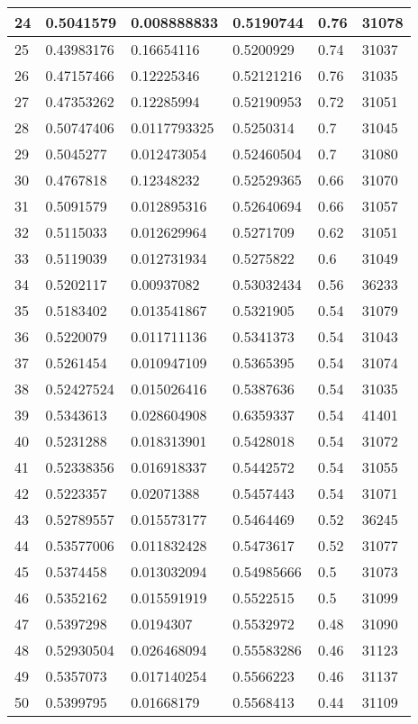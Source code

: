 \begin{longtable}{|l|l|l|l|l|l|}
24 & 0.5041579 & 0.008888833 & 0.5190744 & 0.76 & 31078 \\ \hline 
25 & 0.43983176 & 0.16654116 & 0.5200929 & 0.74 & 31037 \\ \hline 
26 & 0.47157466 & 0.12225346 & 0.52121216 & 0.76 & 31035 \\ \hline 
27 & 0.47353262 & 0.12285994 & 0.52190953 & 0.72 & 31051 \\ \hline 
28 & 0.50747406 & 0.0117793325 & 0.5250314 & 0.7 & 31045 \\ \hline 
29 & 0.5045277 & 0.012473054 & 0.52460504 & 0.7 & 31080 \\ \hline 
30 & 0.4767818 & 0.12348232 & 0.52529365 & 0.66 & 31070 \\ \hline 
31 & 0.5091579 & 0.012895316 & 0.52640694 & 0.66 & 31057 \\ \hline 
32 & 0.5115033 & 0.012629964 & 0.5271709 & 0.62 & 31051 \\ \hline 
33 & 0.5119039 & 0.012731934 & 0.5275822 & 0.6 & 31049 \\ \hline 
34 & 0.5202117 & 0.00937082 & 0.53032434 & 0.56 & 36233 \\ \hline 
35 & 0.5183402 & 0.013541867 & 0.5321905 & 0.54 & 31079 \\ \hline 
36 & 0.5220079 & 0.011711136 & 0.5341373 & 0.54 & 31043 \\ \hline 
37 & 0.5261454 & 0.010947109 & 0.5365395 & 0.54 & 31074 \\ \hline 
38 & 0.52427524 & 0.015026416 & 0.5387636 & 0.54 & 31035 \\ \hline 
39 & 0.5343613 & 0.028604908 & 0.6359337 & 0.54 & 41401 \\ \hline 
40 & 0.5231288 & 0.018313901 & 0.5428018 & 0.54 & 31072 \\ \hline 
41 & 0.52338356 & 0.016918337 & 0.5442572 & 0.54 & 31055 \\ \hline 
42 & 0.5223357 & 0.02071388 & 0.5457443 & 0.54 & 31071 \\ \hline 
43 & 0.52789557 & 0.015573177 & 0.5464469 & 0.52 & 36245 \\ \hline 
44 & 0.53577006 & 0.011832428 & 0.5473617 & 0.52 & 31077 \\ \hline 
45 & 0.5374458 & 0.013032094 & 0.54985666 & 0.5 & 31073 \\ \hline 
46 & 0.5352162 & 0.015591919 & 0.5522515 & 0.5 & 31099 \\ \hline 
47 & 0.5397298 & 0.0194307 & 0.5532972 & 0.48 & 31090 \\ \hline 
48 & 0.52930504 & 0.026468094 & 0.55583286 & 0.46 & 31123 \\ \hline 
49 & 0.5357073 & 0.017140254 & 0.5566223 & 0.46 & 31137 \\ \hline 
50 & 0.5399795 & 0.01668179 & 0.5568413 & 0.44 & 31109 \\ \hline 
\end{longtable}